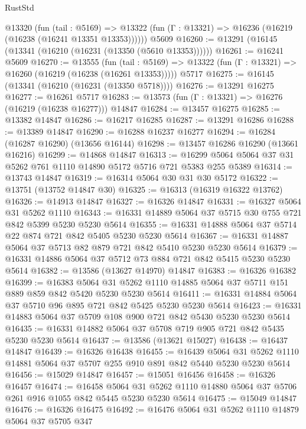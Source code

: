 \begin{lexlean}{RustStd}
\begin{coremodule}
    @13320
      (fun (tail : @5169) =>
      @13322 (fun (Γ : @13321) => @16236 (@16219 (@16238 (@16241 @13351 @13353))))))
    @5609
@16260 := @13291 (@16145 (@13341 (@16210 (@16231 (@13350 (@5610 @13353))))))
@16261 := @16241 @5609
@16270 := @13555
    (fun (tail : @5169) => @13322 (fun (Γ : @13321) => @16260 (@16219 (@16238 (@16261 @13353)))))
    @5717
@16275 := @16145 (@13341 (@16210 (@16231 (@13350 @5718))))
@16276 := @13291 @16275
@16277 := @16261 @5717
@16283 := @13573 (fun (Γ : @13321) => @16276 (@16219 (@16238 @16277))) @14847
@16284 := @13457 @16275
@16285 := @13382 @14847
@16286 := @16217 @16285
@16287 := @13291 @16286
@16288 := @13389 @14847
@16290 := @16288 @16237 @16277
@16294 := @16284 (@16287 @16290) (@13656 @16144)
@16298 := @13457 @16286 @16290 (@13661 @16216)
@16299 := @14868 @14847
@16313 := @16299 @5064 @5064 @37 @31 @5262 @761 @1110 @14890 @5172 @5716 @721 @5383 @255 @5389
@16314 := @13743 @14847
@16319 := @16314 @5064 @30 @31 @30 @5172
@16322 := @13751 (@13752 @14847 @30)
@16325 := @16313 (@16319 @16322 @13762)
@16326 := @14913 @14847
@16327 := @16326 @14847
@16331 := @16327 @5064 @31 @5262 @1110
@16343 := @16331 @14889 @5064 @37 @5715 @30 @755 @721 @842 @5399 @5230 @5230 @5614
@16355 := @16331 @14888 @5064 @37 @5714 @22 @874 @721 @842 @5405 @5230 @5230 @5614
@16367 := @16331 @14887 @5064 @37 @5713 @82 @879 @721 @842 @5410 @5230 @5230 @5614
@16379 := @16331 @14886 @5064 @37 @5712 @73 @884 @721 @842 @5415 @5230 @5230 @5614
@16382 := @13586 (@13627 @14970) @14847
@16383 := @16326 @16382
@16399 := @16383
    @5064
    @31
    @5262
    @1110
    @14885
    @5064
    @37
    @5711
    @151
    @889
    @859
    @842
    @5420
    @5230
    @5230
    @5614
@16411 := @16331 @14884 @5064 @37 @5710 @96 @895 @721 @842 @5425 @5230 @5230 @5614
@16423 := @16331 @14883 @5064 @37 @5709 @108 @900 @721 @842 @5430 @5230 @5230 @5614
@16435 := @16331 @14882 @5064 @37 @5708 @719 @905 @721 @842 @5435 @5230 @5230 @5614
@16437 := @13586 (@13621 @15027)
@16438 := @16437 @14847
@16439 := @16326 @16438
@16455 := @16439
    @5064
    @31
    @5262
    @1110
    @14881
    @5064
    @37
    @5707
    @255
    @910
    @891
    @842
    @5440
    @5230
    @5230
    @5614
@16456 := @15029 @14847
@16457 := @15051 @16456
@16458 := @16326 @16457
@16474 := @16458
    @5064
    @31
    @5262
    @1110
    @14880
    @5064
    @37
    @5706
    @261
    @916
    @1055
    @842
    @5445
    @5230
    @5230
    @5614
@16475 := @15049 @14847
@16476 := @16326 @16475
@16492 := @16476
    @5064
    @31
    @5262
    @1110
    @14879
    @5064
    @37
    @5705
    @347

\end{coremodule}
\end{lexlean}
